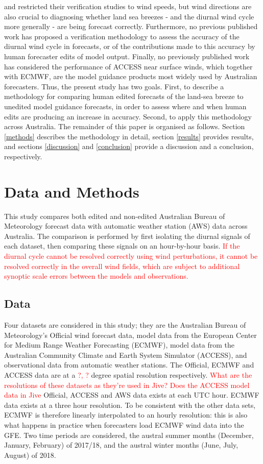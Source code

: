 \documentclass[alpha-refs]{wiley-article}
\begin{document}
\citet{pinson12} and \citet{lynch14} restricted their verification studies to wind speeds, but wind directions are also crucial to diagnosing whether land sea breezes - and the diurnal wind cycle more generally - are being forecast correctly. Furthermore, no previous published work has proposed a verification methodology to assess the accuracy of the diurnal wind cycle in forecasts, or of the contributions made to this accuracy by human forecaster edits of model output. Finally, no previously published work has considered the performance of ACCESS near surface winds, which together with ECMWF, are the model guidance products most widely used by Australian forecasters. Thus, the present study has two goals. First, to describe a methodology for comparing human edited forecasts of the land-sea breeze to unedited model guidance forecasts, in order to assess where and when human edits are producing an increase in accuracy. Second, to apply this methodology across Australia. The remainder of this paper is organised as follows. Section \ref{methods} describes the methodology in detail, section \ref{results} provides results, and sections \ref{discussion} and \ref{conclusion} provide a discussion and a conclusion, respectively.     

\section{Data and Methods} \label{Sec:Methods}
This study compares both edited and non-edited Australian Bureau of Meteorology forecast data with automatic weather station (AWS) data across Australia. The comparison is performed by first isolating the diurnal signals of each dataset, then comparing these signals on an hour-by-hour basis. \textcolor{red}{If the diurnal cycle cannot be resolved correctly using wind perturbations, it cannot be resolved correctly in the overall wind fields, which are subject to additional synoptic scale errors between the models and observations.}

\subsection{Data} 
Four datasets are considered in this study; they are the Australian Bureau of Meteorology's Official wind forecast data, model data from the European Center for Medium Range Weather Forecasting (ECMWF), model data from the Australian Community Climate and Earth System Simulator (ACCESS), and observational data from automatic weather stations. The Official, ECMWF and ACCESS data are at a \textcolor{red}{?, ?} degree spatial resolution respectively. \textcolor{red}{What are the resolutions of these datasets as they're used in Jive? Does the ACCESS model data in Jive} Official, ACCESS and AWS data exists at each UTC hour. ECMWF data exists at a three hour resolution. To be consistent with the other data sets, ECMWF is therefore linearly interpolated to an hourly resolution: this is also what happens in practice when forecasters load ECMWF wind data into the GFE. Two time periods are considered, the austral summer months (December, January, February) of 2017/18, and the austral winter months (June, July, August) of 2018. 
\end{document}
